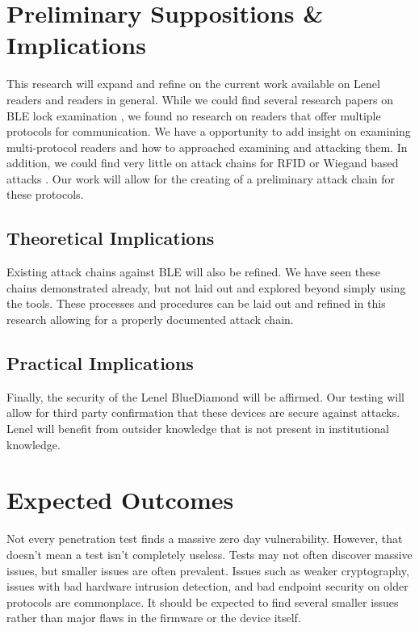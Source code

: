\documentclass[10pt,twocolumn,letterpaper]{article}
\begin{document}
\section{Preliminary Suppositions \& Implications}
This research will expand and refine on the current work available on Lenel readers and readers in general. While we could find several research papers on BLE lock examination \cite{matthewrs2017surveydoorlock}\cite{ho2016smart}\cite{ye2017security}\cite{8887393}, we found no research on readers that offer multiple protocols for communication. We have a opportunity to add insight on examining multi-protocol readers and how to approached examining and attacking them. In addition, we could find very little on attack chains for RFID or Wiegand based attacks \cite{chung2017wiegand}. Our work will allow for the creating of a preliminary attack chain for these protocols.

\subsection{Theoretical Implications}
Existing attack chains against BLE will also be refined. We have seen these chains demonstrated \cite{lonzetta2018security}\cite{BluetoothMITMTal} already, but not laid out and explored beyond simply using the tools. These processes and procedures can be laid out and refined in this research allowing for a properly documented attack chain.

\subsection{Practical Implications}
Finally, the security of the Lenel BlueDiamond will be affirmed. Our testing will allow for third party confirmation that these devices are secure against attacks. Lenel will benefit from outsider knowledge that is not present in institutional knowledge.

\section{Expected Outcomes}
Not every penetration test finds a massive zero day vulnerability.  However, that doesn't mean a test isn't completely useless.  Tests may not often discover massive issues, but smaller issues are often prevalent.  Issues such as weaker cryptography, issues with bad hardware intrusion detection, and bad endpoint security on older protocols are commonplace.  It should be expected to find several smaller issues rather than major flaws in the firmware or the device itself.
\end{document}
